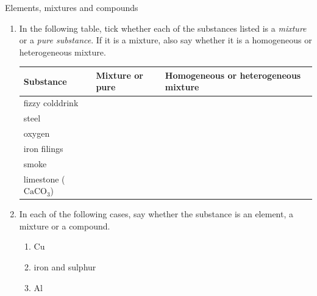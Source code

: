             \begin{exercises}{Elements, mixtures and compounds}{
            \nopagebreak
            \label{m38708*id63472}
 \begin{enumerate}[noitemsep, label=\textbf{\arabic*}. ] 
            \label{m38708*uid28}
    \item In the following table, tick whether each of the substances listed is a \textsl{mixture} or a \textsl{pure substance}. If it is a mixture, also say whether it is a homogeneous or heterogeneous mixture.
          \begin{table}[H]
        \begin{center}
      \label{m38708*id63499}
    \noindent
      \begin{tabular}{|l|l|l|}\hline
        \textbf{Substance} &
        \textbf{Mixture or pure} &
        \textbf{Homogeneous or heterogeneous mixture} \\ \hline
        fizzy colddrink & & \\ \hline
        steel & & \\ \hline
        oxygen & & \\ \hline
        iron filings & & \\ \hline
        smoke & & \\ \hline
        limestone (${\mathrm{CaCO}}_{3}$) & & \\ \hline
    \end{tabular}
      \end{center}
\end{table}
    \par
\label{m38708*uid29}\item In each of the following cases, say whether the substance is an element, a mixture or a compound.
\label{m38708*id63912}\begin{enumerate}[noitemsep, label=\textbf{\alph*}. ] 
            \label{m38708*uid30}\item $\mathrm{Cu}$
\label{m38708*uid31}\item iron and sulphur
\label{m38708*uid32}\item $\mathrm{Al}$

\end{enumerate}
\end{enumerate}}
\end{exercises}
